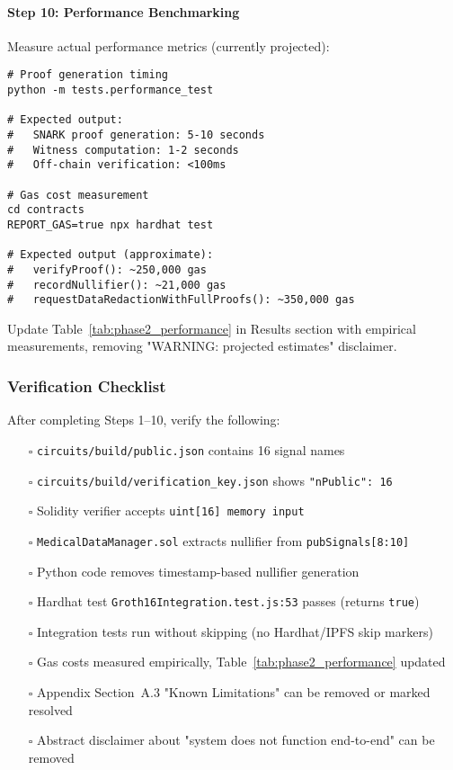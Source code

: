 \paragraph{Step 10: Performance Benchmarking}

Measure actual performance metrics (currently projected):

\begin{verbatim}
# Proof generation timing
python -m tests.performance_test

# Expected output:
#   SNARK proof generation: 5-10 seconds
#   Witness computation: 1-2 seconds
#   Off-chain verification: <100ms

# Gas cost measurement
cd contracts
REPORT_GAS=true npx hardhat test

# Expected output (approximate):
#   verifyProof(): ~250,000 gas
#   recordNullifier(): ~21,000 gas
#   requestDataRedactionWithFullProofs(): ~350,000 gas
\end{verbatim}

Update Table~\ref{tab:phase2_performance} in Results section with empirical measurements, removing "WARNING: projected estimates" disclaimer.

\subsubsection{Verification Checklist}

After completing Steps 1--10, verify the following:

\begin{enumerate}
    \item[$\square$] \texttt{circuits/build/public.json} contains 16 signal names
    \item[$\square$] \texttt{circuits/build/verification\_key.json} shows \texttt{"nPublic": 16}
    \item[$\square$] Solidity verifier accepts \texttt{uint[16] memory input}
    \item[$\square$] \texttt{MedicalDataManager.sol} extracts nullifier from \texttt{pubSignals[8:10]}
    \item[$\square$] Python code removes timestamp-based nullifier generation
    \item[$\square$] Hardhat test \texttt{Groth16Integration.test.js:53} passes (returns \texttt{true})
    \item[$\square$] Integration tests run without skipping (no Hardhat/IPFS skip markers)
    \item[$\square$] Gas costs measured empirically, Table~\ref{tab:phase2_performance} updated
    \item[$\square$] Appendix Section~A.3 "Known Limitations" can be removed or marked resolved
    \item[$\square$] Abstract disclaimer about "system does not function end-to-end" can be removed
\end{enumerate}

